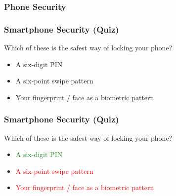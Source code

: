 \documentclass[aspectratio=169,dvipsnames]{beamer}
\begin{document}
\subsubsection{Phone Security}


\begin{frame}
\frametitle{Smartphone Security (Quiz)}

Which of these is the safest way of locking your phone?
\medskip

\begin{itemize}
\item A six-digit PIN
\item A six-point swipe pattern
\item Your fingerprint / face as a biometric pattern
\end{itemize}

\end{frame}

\begin{frame}
\frametitle{Smartphone Security (Quiz)}

Which of these is the safest way of locking your phone?
\medskip

\begin{itemize}
\item \textcolor{ForestGreen}{A six-digit PIN}
\item \textcolor{Red}{A six-point swipe pattern}
\item \textcolor{Red}{Your fingerprint / face as a biometric pattern}
\end{itemize}

\end{frame}

\end{document}
